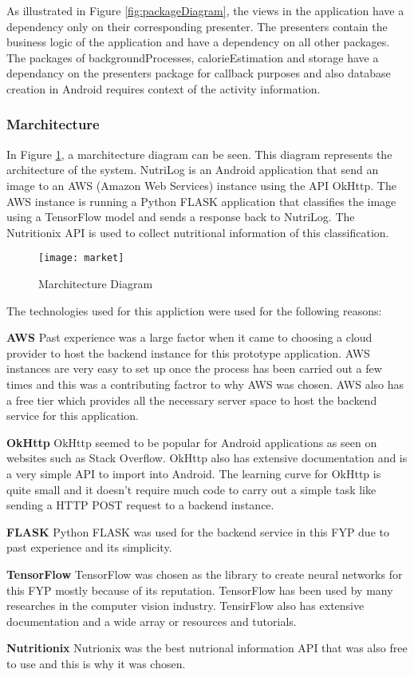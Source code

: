 As illustrated in Figure \ref{fig:packageDiagram}, the views in the application
have a dependency only on their corresponding presenter.
The presenters contain the business logic of the  application and have a dependency on all other packages.
The packages of backgroundProcesses, calorieEstimation and storage have a dependancy on the presenters package for callback purposes and also database creation in Android requires context of the activity information.

\subsubsection*{Marchitecture}
In Figure \ref{fig:market}, a marchitecture diagram can be seen.
This diagram represents the architecture of the system.
NutriLog is an Android application that send an image to an AWS (Amazon Web Services) instance using the API OkHttp. The AWS instance is running a Python FLASK application that classifies the image using a TensorFlow model and sends a response back to NutriLog. The Nutritionix API is used to collect nutritional information of this classification.

\begin{figure}[h]
    \centering
    \texttt{[image: market]}
    \caption{Marchitecture Diagram}
    \label{fig:market}
\end{figure}

The technologies used for this appliction were used for the following reasons:

\textbf{AWS}
\linebreak
Past experience was a large factor when it came to choosing a cloud provider to host the backend instance for this prototype application.
AWS instances are very easy to set up once the process has been carried out a few times and this was a contributing factror to why AWS was chosen.
AWS also has a free tier which provides all the necessary server space to host the backend service for this application.

\textbf{OkHttp}
\linebreak
OkHttp seemed to be popular for Android applications as seen on websites such as Stack Overflow.
OkHttp also has extensive documentation and is a very simple API to import into Android.
The learning curve for OkHttp is quite small and it doesn't require much code to carry out a simple task like sending a HTTP POST request to a backend instance.

\textbf{FLASK}
\linebreak
Python FLASK was used for the backend service in this FYP due to past experience and its simplicity.

\textbf{TensorFlow}
\linebreak
TensorFlow was chosen as the library to create neural networks for this FYP mostly because of its reputation.
TensorFlow has been used by many researches in the computer vision industry.
TensirFlow also has extensive documentation and a wide array or resources and tutorials.

\textbf{Nutritionix}
\linebreak
Nutrionix was the best nutrional information API that was also free to use and this is why it was chosen.